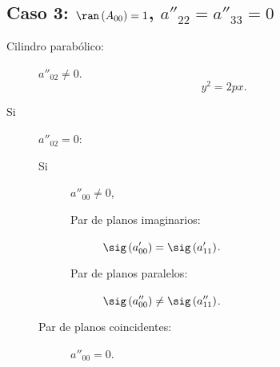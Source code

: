 \subsection*{Caso 3: $\displaystyle \ran\left(A_{00}\right) = 1 $, $\displaystyle a''_{22} = a''_{33} = 0 $ }
\begin{description}
\item[Cilindro parabólico:] $\displaystyle a''_{02} \neq 0 $.
	\[y^{2} = 2px .\]
\item[Si] $\displaystyle a''_{02} = 0 $:
	\begin{description}
		\item[Si] $\displaystyle a''_{00} \neq 0 $, 
		\begin{description}
		\item[Par de planos imaginarios:] $\displaystyle \sig\left(a'_{00}\right) = \sig\left(a'_{11}\right) $. 
		\item[Par de planos paralelos:] $\displaystyle \sig\left(a''_{00}\right) \neq \sig\left(a''_{11}\right) $.
		\end{description}
	\item[Par de planos coincidentes:] $\displaystyle a''_{00} = 0 $.
	\end{description}
\end{description}

